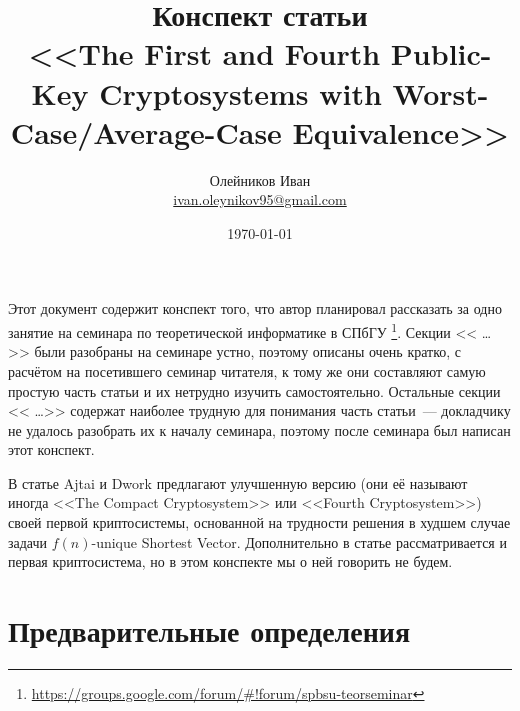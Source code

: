 \documentclass[oneside, a4paper]{article}
\theoremstyle{plain}
\theoremstyle{defn}
\theoremstyle{remark}
\begin{document}
\title{Конспект статьи \\ \foreignlanguage{english}{<<The First and Fourth Public-Key Cryptosystems
with Worst-Case/Average-Case Equivalence>>  \cite{ajtaidwork}}}
\author{Олейников Иван \\ \url{ivan.oleynikov95@gmail.com}}
\date{\today}
\maketitle

Этот документ содержит конспект того, что автор планировал рассказать за одно
занятие на семинара по теоретической информатике в СПбГУ
\footnote{\url{https://groups.google.com/forum/\#!forum/spbsu-teorseminar}}.
Секции << \dots >> были разобраны на семинаре устно, поэтому описаны очень
кратко, с расчётом на посетившего семинар читателя, к тому же они составляют
самую простую часть статьи и их нетрудно изучить самостоятельно. Остальные
секции << \dots >> содержат наиболее трудную для понимания часть статьи~---
докладчику не удалось разобрать их к началу семинара, поэтому после семинара был
написан этот конспект.

В статье \cite{ajtaidwork} Ajtai и Dwork предлагают улучшенную версию (они её
называют иногда \foreignlanguage{english}{<<The Compact Cryptosystem>>} или
\foreignlanguage{english}{<<Fourth Cryptosystem>>}) своей
первой криптосистемы, основанной на трудности решения в худшем случае задачи
\foreignlanguage{english}{$f(n)$-unique Shortest Vector}.
Дополнительно в статье рассматривается и первая криптосистема, но в этом
конспекте мы о ней говорить не будем.

\tableofcontents

\section{Предварительные определения}
\end{document}
